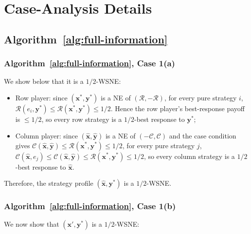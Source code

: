 \section{Case-Analysis Details}
\label{app:case-analysis-details}

\subsection{Algorithm~\ref{alg:full-information}}
\label{app:case-analysis-details-algo-1}

\subsubsection{Algorithm~\ref{alg:full-information}, Case 1(a)}
\label{app:case-one-low}

We show below that it is a \(1/2\)-WSNE:

\begin{itemize}
  \item Row player: since \((\mathbf{x}^*, \mathbf{y}^*)\) is a NE of \((\mathcal{R}, -\mathcal{R})\), for every pure strategy \(i\), \(\mathcal{R}(e_i, \mathbf{y}^*) \le \mathcal{R}(\mathbf{x}^*, \mathbf{y}^*) \le 1/2\). Hence the row player's best-response payoff is \(\le 1/2\), so every row strategy is a \(1/2\)-best response to \(\mathbf{y}^*\);
  \item Column player: since \((\hat{\mathbf{x}}, \hat{\mathbf{y}})\) is a NE of \((-\mathcal{C}, \mathcal{C})\) and the case condition gives \(\mathcal{C}(\hat{\mathbf{x}}, \hat{\mathbf{y}}) \le \mathcal{R}(\mathbf{x}^*, \mathbf{y}^*) \le 1/2\), for every pure strategy \(j\), \(\mathcal{C}(\hat{\mathbf{x}}, e_j) \le \mathcal{C}(\hat{\mathbf{x}}, \hat{\mathbf{y}}) \le \mathcal{R}(\mathbf{x}^*, \mathbf{y}^*) \le 1/2\), so every column strategy is a \(1/2\)-best response to \(\hat{\mathbf{x}}\).
\end{itemize}

Therefore, the strategy profile \((\hat{\mathbf{x}}, \mathbf{y}^*)\) is a \(1/2\)-WSNE.

\subsubsection{Algorithm~\ref{alg:full-information}, Case 1(b)}
\label{app:case-one-low-high}

We now show that \((\mathbf{x}', \mathbf{y}^*)\) is a \(1/2\)-WSNE:

